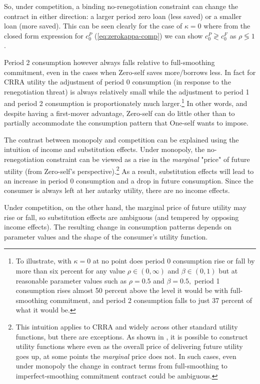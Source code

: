 \documentclass[11pt,english]{article}
\theoremstyle{plain}
\theoremstyle{definition}
\begin{document}
So, under competition, a binding no-renegotiation constraint can
change the contract in either direction: a larger period zero loan (less saved)
or a smaller loan (more saved). This can be seen clearly for the case of $\kappa=0$ where from the closed form expression for \(c_0^P\) (\ref{eq:zerokappa-comp}) we can show  \(c_{0}^{P} \gtrless c_{0}^{F} \) as \(\rho \lessgtr 1\).

Period 2 consumption however always
falls relative to full-smoothing commitment, even in the
cases when Zero-self saves more/borrows less. In fact for CRRA utility
the adjustment of period 0 consumption (in response to the renegotiation threat) is always relatively small while the
adjustment to period 1 and period 2 consumption is proportionately much
larger.\footnote{To illustrate, with $\kappa=0$ at no point does period 0 consumption
rise or fall by more than six percent for any value $\rho\in(0,\infty)$
and $\beta\in(0,1)$ but at reasonable parameter values such as $\rho=0.5$
and $\beta=0.5,$  period 1 consumption
rises almost 50 percent above the level it would be with full-smoothing commitment, and
period 2 consumption falls to just 37 percent of what it would be.} In other words, and despite having a first-mover advantage, Zero-self
can do little other than to partially accommodate the consumption
pattern that One-self wants to impose.

The contrast between monopoly and competition can be explained using
the intuition of income and substitution effects. Under monopoly, the no-renegotiation constraint can be viewed as a rise in the \emph{marginal} "price" of future utility (from Zero-self's perspective).\footnote{This intuition applies to CRRA and widely across other standard utility
functions, but there are exceptions. As shown in \citet{basu2020},
it is possible to construct utility functions where even as the overall
price of delivering future utility goes up, at some points the \emph{marginal}
price does not. In such cases, even under monopoly the change in contract
terms from full-smoothing to imperfect-smoothing commitment contract
could be ambiguous.} As a result, substitution effects will lead to an increase
in period 0 consumption and a drop in future consumption. Since the consumer is always left at her autarky utility, there are
no income effects. 

Under competition, on the other hand, the marginal price of future utility may rise or fall, so substitution effects are ambiguous (and tempered by opposing income effects). The resulting change in consumption patterns depends on parameter values and the shape of the consumer's utility function.
\end{document}
